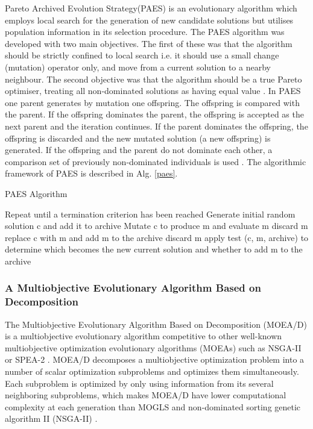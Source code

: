 \documentclass[espaco=umemeio,chapter=TITLE,twoside,openright]{abnt}
\begin{document}
Pareto Archived Evolution Strategy(PAES) is an  evolutionary algorithm which employs
local search for the generation of new candidate solutions but
utilises population information in its selection procedure. The PAES algorithm was developed with two main objectives. The first of these was that the algorithm should be strictly confined to local search i.e. it should use a small change (mutation) operator only, and move from a current solution to a nearby neighbour. The second objective was that the algorithm should be a true Pareto optimiser, treating all non-dominated solutions as having equal value \cite{Knowles1999}. In PAES one parent generates by mutation one
offspring. The offspring is compared with the parent. If the offspring dominates the parent, the offspring is accepted as
the next parent and the iteration continues. If the parent dominates the offspring, the offspring is discarded and the new mutated solution (a new offspring) is generated. If the offspring and the parent do not dominate each other, a comparison set of previously non-dominated individuals is used \cite{Knowles1999}\cite{Oltean2005}. The algorithmic framework of PAES is described in Alg. \ref{paes}.


\begin{algorithm}[h]
  \caption{PAES Algorithm \cite{Knowles1999}\cite{Oltean2005}}\label{paes}
  \begin{algorithmic}[1]
    \State Repeat until a termination criterion has been reached
    \State Generate initial random solution c and add it to archive
    \State Mutate c to produce m and evaluate m
    \State discard m
    \Else
     \State replace c with m and add m to the archive
    \Else
    \State discard m
    \Else
    \State apply test (c, m, archive) to determine which becomes the new current solution and whether to add m to the archive
    \EndIf
    \EndIf
    \EndIf
  \end{algorithmic}
\end{algorithm}

\subsubsection{A Multiobjective Evolutionary Algorithm Based on Decomposition}

The Multiobjective Evolutionary Algorithm Based on Decomposition (MOEA/D) is a multiobjective evolutionary algorithm competitive to other well-known multiobjective optimization evolutionary algorithms (MOEAs) such as NSGA-II or SPEA-2 \cite{Michalak2014}. MOEA/D decomposes a multiobjective optimization problem into a number of scalar optimization subproblems and optimizes them simultaneously. Each subproblem is optimized by only using information from its several neighboring subproblems, which makes MOEA/D have lower computational complexity at each generation than MOGLS and non-dominated sorting genetic
algorithm II (NSGA-II) \cite{Zhang2007}. 
\end{document}
